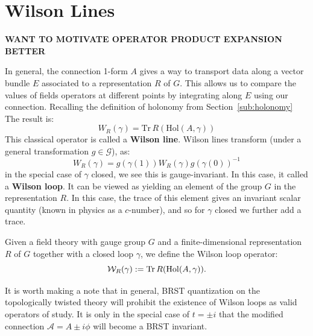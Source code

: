 



\section{Wilson Lines} %
\label{sec:wilson_lines}

	\textbf{WANT TO MOTIVATE OPERATOR PRODUCT EXPANSION BETTER}

	In general, the connection 1-form $A$ gives a way to transport data along a vector bundle $E$ associated to a representation $R$ of $G$. This allows us to compare the values of fields operators at different points by integrating along $E$ using our connection. Recalling the definition of holonomy from Section~\ref{sub:holonomy} The result is: 
	\begin{equation}
		W_R (\gamma) = \mathrm{Tr}\, R( \mathrm{Hol}(A, \gamma))
	\end{equation}
	This classical operator is called a \textbf{Wilson line}.
	Wilson lines transform (under a general transformation $g \in \mathcal G$), as:
	\begin{equation}
		W_R(\gamma) = g(\gamma(1)) W_R(\gamma)  g(\gamma(0))^{-1}
	\end{equation}
	in the special case of $\gamma$ closed, we see this is gauge-invariant. In this case, it called a \textbf{Wilson loop}. It can be viewed as yielding an element of the group $G$ in the representation $R$. In this case, the trace of this element gives an invariant scalar quantity (known in physics as a $c$-number), and so for $\gamma$ closed we further add a trace.
	\begin{defn}
		Given a field theory with gauge group $G$ and a finite-dimensional representation $R$ of $G$ together with a closed loop $\gamma$, we define the Wilson loop operator:
		\begin{equation}
			\mathcal W_{R}(\gamma) := \mathrm{Tr}\, R( \mathrm{Hol}(A, \gamma)).
		\end{equation}
	\end{defn}
\noindent

	It is worth making a note that in general, BRST quantization on the topologically twisted theory will prohibit the existence of Wilson loops as valid operators of study. It is only in the special case of $t = \pm i$ that the modified connection $\mathcal A = A \pm i \phi$ will become a BRST invariant. 
	

